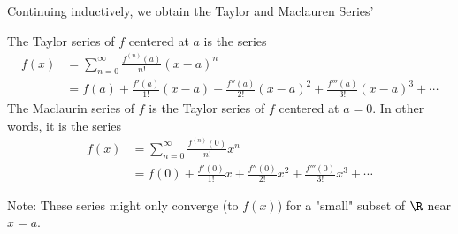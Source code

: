 \begin{frame}
 Continuing inductively, we obtain the Taylor and Maclauren Series' 

\begin{definition}
The Taylor series of $f$ centered at $ a $ is the series
\abovedisplayskip=0pt
\belowdisplayskip=0pt
\begin{align*}
f(x) & = \sum_{n=0}^\infty \frac{f^{(n)}(a)}{n!}(x-a)^n\\ 
& = f(a) + \frac{f'(a)}{1!}(x-a) + \frac{f''(a)}{2!}(x-a)^2 + \frac{f'''(a)}{3!}(x-a)^3 + \cdots%
\end{align*}\pause 
The Maclaurin series of $f$ is the Taylor series of $f$ centered at $a = 0$.  In other words, it is the series
\abovedisplayskip=0pt
\belowdisplayskip=0pt
\begin{align*}
f(x) &= \sum_{n=0}^\infty \frac{f^{(n)}(0)}{n!}x^n\\
& = f(0) + \frac{f'(0)}{1!}x + \frac{f''(0)}{2!}x^2 + \frac{f'''(0)}{3!}x^3 + \cdots%
\end{align*}
\end{definition}
Note: These series might only converge (to $ f(x) $) for a "small" subset of $ \R $ near $ x=a $. 
\end{frame}
